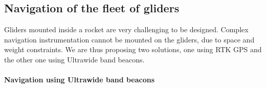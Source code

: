 \subsection{Navigation of the fleet of gliders}

Gliders mounted inside a rocket are very challenging to be designed. 
Complex navigation instrumentation cannot be mounted on the gliders, due to space and weight constraints. 
We are thus proposing two solutions, one using RTK GPS and the other one using Ultrawide band beacons.





\paragraph{Navigation using Ultrawide band beacons}
\hfill \break



